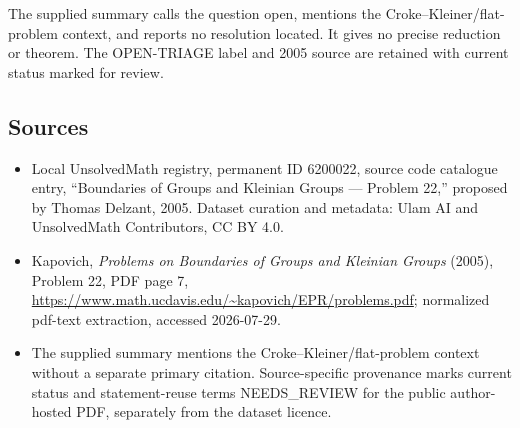 \documentclass[11pt]{article}
\begin{document}
The supplied summary calls the question open, mentions the Croke--Kleiner/flat-problem context, and reports no resolution located. It gives no precise reduction or theorem. The OPEN-TRIAGE label and 2005 source are retained with current status marked for review.
\subsection{Sources}
\begin{itemize}
\item Local UnsolvedMath registry, permanent ID 6200022, source code catalogue entry, ``Boundaries of Groups and Kleinian Groups --- Problem 22,'' proposed by Thomas Delzant, 2005. Dataset curation and metadata: Ulam AI and UnsolvedMath Contributors, CC BY 4.0.
\item Kapovich, \emph{Problems on Boundaries of Groups and Kleinian Groups} (2005), Problem 22, PDF page 7, \url{https://www.math.ucdavis.edu/~kapovich/EPR/problems.pdf}; normalized pdf-text extraction, accessed 2026-07-29.
\item The supplied summary mentions the Croke--Kleiner/flat-problem context without a separate primary citation. Source-specific provenance marks current status and statement-reuse terms NEEDS\_REVIEW for the public author-hosted PDF, separately from the dataset licence.
\end{itemize}
\end{document}

